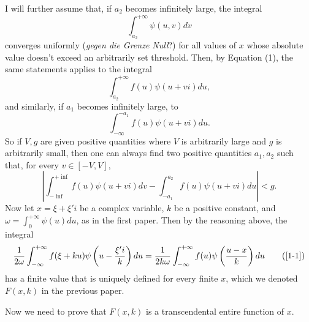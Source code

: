 \documentclass{article}
\begin{document}
I will further assume that, if $a_2$ becomes infinitely large, the integral
\begin{equation*}
\int_{a_2}^{+\infty} \psi(u,v)dv
\end{equation*}
converges uniformly (\textit{gegen die Grenze Null}?) for all values of $x$ whose absolute value doesn't exceed an arbitrarily set threshold. Then, by Equation (1), the same statements applies to the integral
\begin{equation*}
\int_{a_2}^{+\infty} f(u)\psi(u+vi)du,
\end{equation*}
and similarly, if $a_1$ becomes infinitely large, to
\begin{equation*}
\int_{-\infty}^{-a_1} f(u)\psi(u+vi)du.
\end{equation*}
So if $V,g$ are given positive quantities where $V$ is arbitrarily large and $g$ is arbitrarily small, then one can always find two positive quantities $a_1,a_2$ such that, for every $v\in[-V,V]$, 
\begin{equation*}
\left|\int_{-\inf}^{+\inf} f(u)\psi(u+vi)dv-\int_{-a_1}^{a_2}f(u)\psi(u+vi)du\right|<g.
\end{equation*}
Now let $x=\xi+\xi'i$ be a complex variable, $k$ be a positive constant, and $\omega=\int_0^{+\infty}\psi(u)du$, as in the first paper. Then by the reasoning above, the integral
\begin{equation}
\frac{1}{2\omega}\int_{-\infty}^{+\infty}f(\xi+ku)\psi\left(u-\frac{\xi'i}{k}\right)du = \frac{1}{2k\omega}\int_{-\infty}^{+\infty}f(u)\psi\left(\frac{u-x}{k}\right)du
\tag{\ref{1-1}}
\end{equation}
has a finite value that is uniquely defined for every finite $x$, which we denoted $F(x,k)$ in the previous paper.

Now we need to prove that $F(x,k)$ is a transcendental entire function of $x$. 
\end{document}
